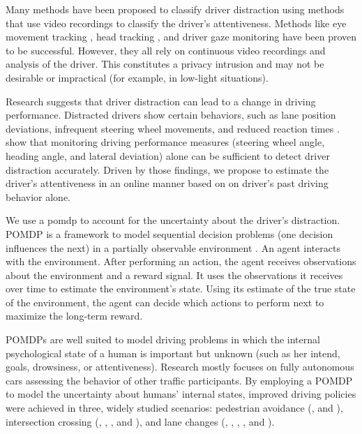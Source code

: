 Many methods have been proposed to classify driver distraction using methods that use video recordings to classify the driver's attentiveness. Methods like eye movement tracking \parencite{eye-movement}, head tracking \parencite{head-tracking}, and driver gaze monitoring \parencite{gaze-monitoring} have been proven to be successful. However, they all rely on continuous video recordings and analysis of the driver. This constitutes a privacy intrusion and may not be desirable or impractical (for example, in low-light situations). 

Research suggests that driver distraction can lead to a change in driving performance. Distracted drivers show certain behaviors, such as lane position deviations, infrequent steering wheel movements, and reduced reaction times \parencite{driver-distraction-review}. \cite{dist-det-perf} show that monitoring driving performance measures (steering wheel angle, heading angle, and lateral deviation) alone can be sufficient to detect driver distraction accurately. Driven by those findings, we propose to estimate the driver's attentiveness in an online manner based on on driver's past driving behavior alone.

We use a \acrfull{pomdp} to account for the uncertainty about the driver's distraction. POMDP is a framework to model sequential decision problems (one decision influences the next) in a partially observable environment \parencite{pomdp-definition}. An agent interacts with the environment. After performing an action, the agent receives observations about the environment and a reward signal. It uses the observations it receives over time to estimate the environment's state. Using its estimate of the true state of the environment, the agent can decide which actions to perform next to maximize the long-term reward.

POMDPs are well suited to model driving problems in which the internal psychological state of a human is important but unknown (such as her intend, goals, drowsiness, or attentiveness). Research mostly focuses on fully autonomous cars assessing the behavior of other traffic participants. By employing a POMDP to model the uncertainty about humans' internal states, improved driving policies were achieved in three, widely studied scenarios: pedestrian avoidance (\cite{despot-crowd}, and \cite{pomdp-pedestrian-avoid-2}), intersection crossing (\cite{pomdp-intersection}, \cite{att_intersec}, \cite{pomdp-intersection-2}, and \cite{pomdp-intersection-3}), and lane changes (\cite{pomdp-lane-changes}, \cite{att_intersec}, \cite{pomdp-lane-changes-2}, \cite{tactical-decision}, and \cite{pomdp_towards_human}). 

